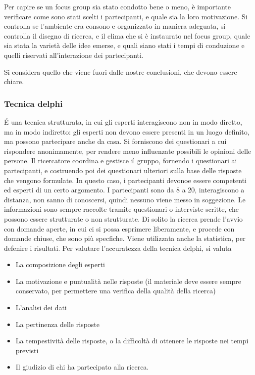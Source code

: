 Per capire se un focus group sia stato condotto bene o meno, è importante verificare come sono stati scelti i partecipanti, e quale sia la loro motivazione. Si controlla se l'ambiente era consono e organizzato in maniera adeguata, si controlla il disegno di ricerca, e il clima che si è instaurato nel focus group, quale sia stata la varietà delle idee emerse, e quali siano stati i tempi di conduzione e quelli riservati all'interazione dei partecipanti.

Si considera quello che viene fuori dalle nostre conclusioni, che devono essere chiare.

\subsubsection{Tecnica delphi}
\'E una tecnica strutturata, in cui gli esperti interagiscono non in modo diretto, ma in modo indiretto: gli esperti non devono essere presenti in un luogo definito, ma possono partecipare anche da casa. Si forniscono dei questionari a cui rispondere anonimamente, per rendere meno influenzate possibili le opinioni delle persone. Il ricercatore coordina e gestisce il gruppo, fornendo i questionari ai partecipanti, e costruendo poi dei questionari ulteriori sulla base delle risposte che vengono formulate. In questo caso, i partecipanti devonoe essere competenti ed esperti di un certo argomento. I partecipanti sono da 8 a 20, interagiscono a distanza, non sanno di conoscersi, quindi nessuno viene messo in soggezione. Le informazioni sono sempre raccolte tramite questionari o interviste scritte, che possono essere strutturate o non strutturate. Di solito la ricerca prende l'avvio con domande aperte, in cui ci si possa esprimere liberamente, e procede con domande chiuse, che sono più specfiche. Viene utilizzata anche la statistica, per defenire i risultati.
Per valutare l'accuratezza della tecnica delphi, si valuta
\begin{itemize}
\item La composizione degli esperti
\item La motivazione e puntualità nelle risposte (il materiale deve essere sempre conservato, per permettere una verifica della qualità della ricerca)
\item L'analisi dei dati
\item La pertinenza delle risposte
\item La tempestività delle risposte, o la difficoltà di ottenere le risposte nei tempi previsti
\item Il giudizio di chi ha partecipato alla ricerca.
\end{itemize}

